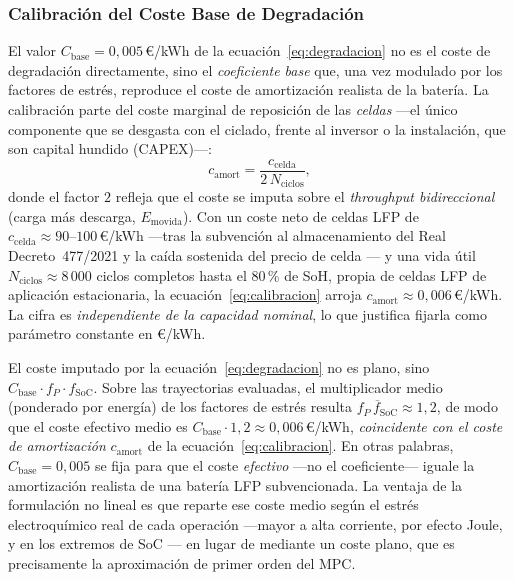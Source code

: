\documentclass[12pt, a4paper, twoside]{report}
\begin{document}
\subsubsection{Calibración del Coste Base de Degradación}
\label{sub:calibracion-degradacion}

El valor $C_{\text{base}} = 0{,}005$\,€/kWh de la ecuación~\eqref{eq:degradacion}
no es el coste de degradación directamente, sino el \emph{coeficiente base} que,
una vez modulado por los factores de estrés, reproduce el coste de amortización
realista de la batería. La calibración parte del coste marginal de reposición de
las \emph{celdas} —el único componente que se desgasta con el ciclado, frente al
inversor o la instalación, que son capital hundido (CAPEX)—:
\begin{equation}
  c_{\text{amort}} = \frac{c_{\text{celda}}}{2\,N_{\text{ciclos}}},
  \label{eq:calibracion}
\end{equation}
donde el factor $2$ refleja que el coste se imputa sobre el \emph{throughput
bidireccional} (carga más descarga, $E_{\text{movida}}$). Con un coste neto de
celdas LFP de $c_{\text{celda}}\!\approx\!90\text{--}100$\,€/kWh —tras la
subvención al almacenamiento del Real Decreto~477/2021 \citep{RD477_2021} y la
caída sostenida del precio de celda \citep{BNEF2024,Schmidt2019}— y una vida útil
$N_{\text{ciclos}}\!\approx\!8\,000$ ciclos completos hasta el 80\,\% de SoH, propia
de celdas LFP de aplicación estacionaria, la ecuación~\eqref{eq:calibracion}
arroja $c_{\text{amort}}\!\approx\!0{,}006$\,€/kWh. La cifra es \emph{independiente
de la capacidad nominal}, lo que justifica fijarla como parámetro constante en
€/kWh.

El coste imputado por la ecuación~\eqref{eq:degradacion} no es plano, sino
$C_{\text{base}}\cdot f_P\cdot f_{\text{SoC}}$. Sobre las trayectorias evaluadas, el
multiplicador medio (ponderado por energía) de los factores de estrés resulta
$\overline{f_P\,f_{\text{SoC}}}\!\approx\!1{,}2$, de modo que el coste efectivo
medio es $C_{\text{base}}\cdot 1{,}2\!\approx\!0{,}006$\,€/kWh, \emph{coincidente
con el coste de amortización} $c_{\text{amort}}$ de la
ecuación~\eqref{eq:calibracion}. En otras palabras, $C_{\text{base}}=0{,}005$ se
fija para que el coste \emph{efectivo} —no el coeficiente— iguale la amortización
realista de una batería LFP subvencionada. La ventaja de la formulación no lineal
es que reparte ese coste medio según el estrés electroquímico real de cada
operación —mayor a alta corriente, por efecto Joule, y en los extremos de SoC
\citep{Vetter2005, Xu2016}— en lugar de mediante un coste plano, que es
precisamente la aproximación de primer orden del MPC.
\end{document}
